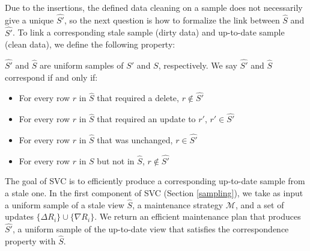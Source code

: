 Due to the insertions, the defined data cleaning on a sample does not necessarily give a unique $\hat{S'}$, so the next question is how to formalize the link between $\hat{S}$ and $\hat{S'}$. 
To link a corresponding stale sample (dirty data) and up-to-date sample (clean data), we define the following property:
\begin{definition}[Correspondence]
$\hat{S'}$ and $\hat{S}$ are uniform samples of $S'$ and $S$, respectively.  We say $\hat{S'}$ and $\hat{S}$ correspond if and only if:
\vspace{-.25em}
\begin{itemize}[noitemsep]
\item For every row $r$ in $\hat{S}$ that required a delete, $r \not\in \hat{S'}$
\item For every row $r$ in $\hat{S}$ that required an update to $r'$, $r' \in \hat{S'}$
\item For every row $r$ in $\hat{S}$  that was unchanged, $r \in \hat{S'}$
\item For every row $r$ in $S$ but not in $\hat{S}$, $r \not\in \hat{S'}$
\end{itemize}
\vspace{-.25em}
\label{correspondence}
\end{definition}

The goal of SVC is to efficiently produce a corresponding up-to-date sample from a stale one.
In the first component of SVC (Section \ref{sampling}), we take as input a uniform sample of a stale view $\hat{S}$, a maintenance strategy $\mathcal{M}$, and a set of updates $\{\Delta R_i\} \cup \{\nabla R_i\}$.
We return an efficient maintenance plan that produces $\hat{S'}$, a uniform sample of the up-to-date view that satisfies the correspondence property with $\hat{S}$.

